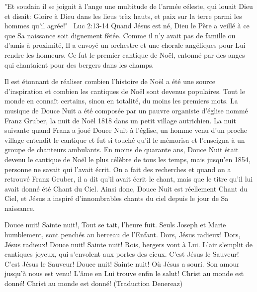 

"Et soudain il se joignit à l'ange une multitude de l'armée céleste, qui louait Dieu et disait: Gloire à Dieu dans les lieus trèx hauts, et paix sur la terre parmi les hommes qu'il agrée!"                                                                                ~Luc 2:13-14
Quand Jésus est né, Dieu le Père a veillé à ce que Sa naissance soit dignement fêtée. Comme il n'y avait pas de famille ou d'amis à proximité, Il a envoyé un orchestre et une chorale angéliques pour Lui rendre les honneurs. Ce fut le premier cantique de Noël, entonné par des anges qui chantaient pour des bergers dans les champs.

Il est étonnant de réaliser combien l'histoire de Noël a été une source d'inspiration et combien les cantiques de Noël sont devenus populaires. Tout le monde en connaît certains, sinon en totalité, du moins les premiers mots. La musique de Douce Nuit a été composée par un pauvre organiste d'église nommé Franz Gruber, la nuit de Noël 1818 dans un petit village autrichien. La nuit suivante quand Franz a joué Douce Nuit à l'église, un homme venu d'un proche village entendit le cantique et fut si touché qu'il le mémorisa et l'enseigna à un groupe de chanteurs ambulants. En moins de quarante ans, Douce Nuit était devenu le cantique de Noël le plus célèbre de tous les temps, mais jusqu'en 1854, personne ne savait qui l'avait écrit. On a fait des recherches et quand on a retrouvé Franz Gruber, il a dit qu'il avait écrit le chant, mais que le titre qu'il lui avait donné été Chant du Ciel. Ainsi donc, Douce Nuit est réellement Chant du Ciel, et Jésus a inspiré d'innombrables chants du ciel depuis le jour de Sa naissance. 


Douce nuit! Sainte nuit!, Tout se tait, l'heure fuit.
Seuls Joseph et Marie humblement,
sont penchés au berceau de l'Enfant.
Dors, Jésus radieux!  Dors, Jésus radieux!
Douce nuit! Sainte nuit!
Rois, bergers vont à Lui.
L'air s'emplit de cantiques joyeux,
qui s'envolent aux portes des cieux.
C'est Jésus le Sauveur!
C'est Jésus le Sauveur!
Douce nuit! Sainte nuit!
Où Jésus a souri.
Son amour jusqu'à nous est venu!
L'âme en Lui trouve enfin le salut!
Christ au monde est donné!
Christ au monde est donné!
(Traduction Denereaz)


